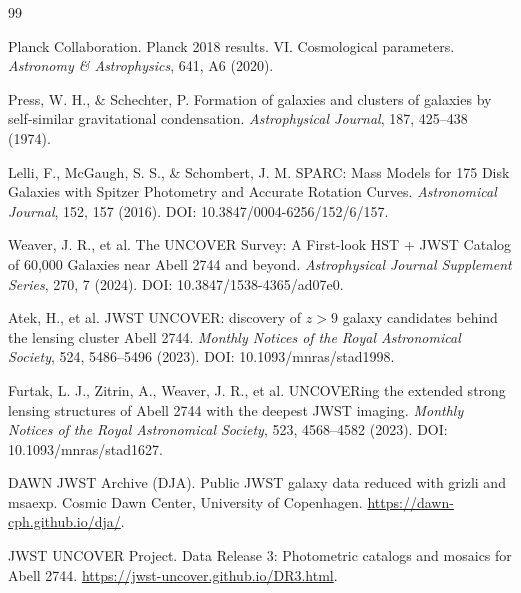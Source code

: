 \documentclass[11pt,a4paper]{article}
\begin{document}
\begin{thebibliography}{99}

Planck Collaboration. Planck 2018 results. VI. Cosmological parameters. \emph{Astronomy \& Astrophysics}, 641, A6 (2020).

Press, W. H., \& Schechter, P. Formation of galaxies and clusters of galaxies by self-similar gravitational condensation. \emph{Astrophysical Journal}, 187, 425--438 (1974).

Lelli, F., McGaugh, S. S., \& Schombert, J. M. SPARC: Mass Models for 175 Disk Galaxies with Spitzer Photometry and Accurate Rotation Curves. \emph{Astronomical Journal}, 152, 157 (2016). DOI: 10.3847/0004-6256/152/6/157.

Weaver, J. R., et al. The UNCOVER Survey: A First-look HST + JWST Catalog of 60,000 Galaxies near Abell 2744 and beyond. \emph{Astrophysical Journal Supplement Series}, 270, 7 (2024). DOI: 10.3847/1538-4365/ad07e0.

Atek, H., et al. JWST UNCOVER: discovery of $z>9$ galaxy candidates behind the lensing cluster Abell 2744. \emph{Monthly Notices of the Royal Astronomical Society}, 524, 5486--5496 (2023). DOI: 10.1093/mnras/stad1998.

Furtak, L. J., Zitrin, A., Weaver, J. R., et al. UNCOVERing the extended strong lensing structures of Abell 2744 with the deepest JWST imaging. \emph{Monthly Notices of the Royal Astronomical Society}, 523, 4568--4582 (2023). DOI: 10.1093/mnras/stad1627.

DAWN JWST Archive (DJA). Public JWST galaxy data reduced with grizli and msaexp. Cosmic Dawn Center, University of Copenhagen. \url{https://dawn-cph.github.io/dja/}.

JWST UNCOVER Project. Data Release 3: Photometric catalogs and mosaics for Abell 2744. \url{https://jwst-uncover.github.io/DR3.html}.

\end{thebibliography}
\end{document}
